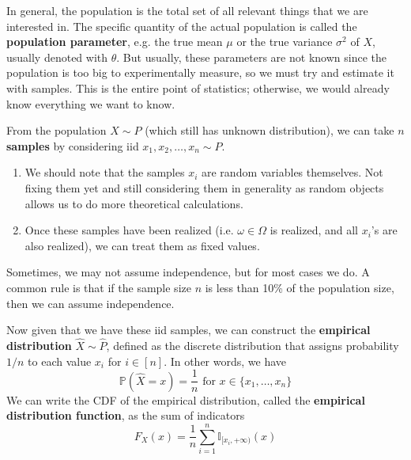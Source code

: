  In general, the population is the total set of all relevant things that we are interested in. The specific quantity of the actual population is called the \textbf{population parameter}, e.g. the true mean $\mu$ or the true variance $\sigma^2$ of $X$, usually denoted with $\theta$. But usually, these parameters are not known since the population is too big to experimentally measure, so we must try and estimate it with samples. This is the entire point of statistics; otherwise, we would already know everything we want to know. 

  \begin{definition}[Samples]
    From the population $X \sim P$ (which still has unknown distribution), we can take $n$ \textbf{samples} by considering iid $x_1, x_2, \ldots, x_n \sim P$. 
    \begin{enumerate}
      \item We should note that the samples $x_i$ are random variables themselves. Not fixing them yet and still considering them in generality as random objects allows us to do more theoretical calculations. 
      \item Once these samples have been realized (i.e. $\omega \in \Omega$ is realized, and all $x_i$'s are also realized), we can treat them as fixed values. 
    \end{enumerate}
    Sometimes, we may not assume independence, but for most cases we do. A common rule is that if the sample size $n$ is less than 10\% of the population size, then we can assume independence. 
  \end{definition}

  \begin{definition}
    Now given that we have these iid samples, we can construct the \textbf{empirical distribution} $\widehat{X} \sim \widehat{P}$, defined as the discrete distribution that assigns probability $1/n$ to each value $x_i$ for $i \in [n]$. In other words, we have 
    \begin{equation}
      \mathbb{P}(\widehat{X} = x) = \frac{1}{n} \text{ for } x \in \{x_1, \ldots, x_n\}
    \end{equation}
    We can write the CDF of the empirical distribution, called the \textbf{empirical distribution function}, as the sum of indicators
    \begin{equation}
      F_X (x) = \frac{1}{n} \sum_{i=1}^n \mathbb{I}_{[x_i, +\infty)} (x)
    \end{equation}
  \end{definition}

